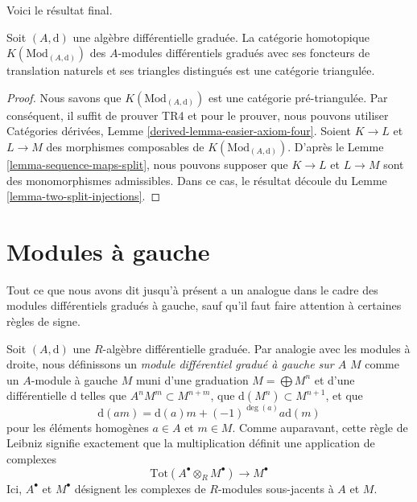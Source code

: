 \noindent
Voici le résultat final.

\begin{proposition}
\label{proposition-homotopy-category-triangulated}
Soit $(A, \text{d})$ une algèbre différentielle graduée. La catégorie homotopique
$K(\text{Mod}_{(A, \text{d})})$ des $A$-modules différentiels gradués avec ses
foncteurs de translation naturels et ses triangles distingués est une catégorie
triangulée.
\end{proposition}

\begin{proof}
Nous savons que $K(\text{Mod}_{(A, \text{d})})$ est une catégorie pré-triangulée.
Par conséquent, il suffit de prouver TR4 et pour le prouver, nous pouvons utiliser
Catégories dérivées, Lemme \ref{derived-lemma-easier-axiom-four}. Soient
$K \to L$ et $L \to M$ des morphismes composables de $K(\text{Mod}_{(A,
\text{d})})$. D'après le Lemme \ref{lemma-sequence-maps-split}, nous pouvons
supposer que $K \to L$ et $L \to M$ sont des monomorphismes admissibles. Dans ce
cas, le résultat découle du Lemme \ref{lemma-two-split-injections}.
\end{proof}











\section{Modules à gauche}
\label{section-left-modules}

\noindent
Tout ce que nous avons dit jusqu'à présent a un analogue dans le cadre des modules
différentiels gradués à gauche, sauf qu'il faut faire attention à certaines règles
de signe.

\medskip\noindent
Soit $(A, \text{d})$ une $R$-algèbre différentielle graduée. Par analogie avec les
modules à droite, nous définissons un {\it module différentiel gradué à gauche
sur $A$} $M$ comme un $A$-module à gauche $M$ muni d'une graduation $M =
\bigoplus M^n$ et d'une différentielle $\text{d}$ telles que $A^n M^m \subset M^{n +
m}$, que $\text{d}(M^n) \subset M^{n + 1}$, et que
$$
\text{d}(am) = \text{d}(a) m + (-1)^{\deg(a)}a \text{d}(m)
$$
pour les éléments homogènes $a \in A$ et $m \in M$. Comme auparavant, cette règle
de Leibniz signifie exactement que la multiplication définit une application de
complexes
$$
\text{Tot}(A^\bullet \otimes_R M^\bullet) \to M^\bullet
$$
Ici, $A^\bullet$ et $M^\bullet$ désignent les complexes de $R$-modules
sous-jacents à $A$ et $M$.

